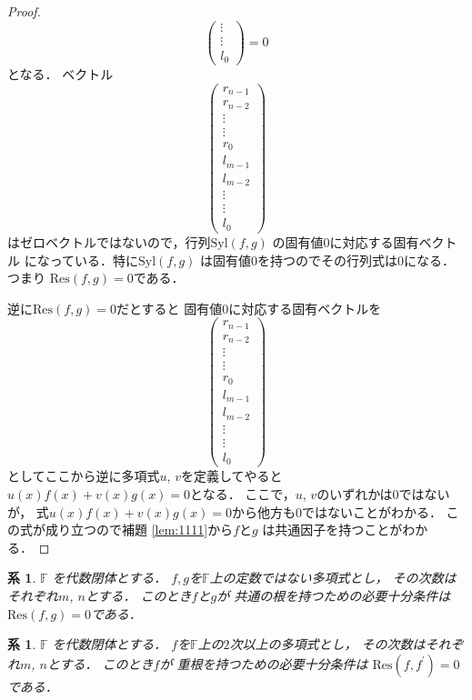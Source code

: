 \documentclass[leqno, a4paper, 12pt]{jsarticle}
\newtheorem{cor}[thm]{系}
\newcommand{\myfi}{\mathbb{F}}
\newcommand{\mysyl}{\mathrm{Syl}}
\newcommand{\myres}{\mathrm{Res}}
\begin{document}
\begin{proof}
\[\begin{pmatrix}
\vdots\\
\vdots\\
l_{0}
\end{pmatrix}
=0
\]
となる．
ベクトル
\[
\begin{pmatrix}
r_{n-1}\\
r_{n-2}\\
\vdots\\
\vdots\\
r_{0}\\
l_{m-1}\\
l_{m-2}\\
\vdots\\
\vdots\\
l_{0}
\end{pmatrix}
\]
はゼロベクトルではないので，行列$\mysyl(f, g)$
の固有値$0$に対応する固有ベクトル
になっている．特に$\mysyl(f, g)$
は固有値$0$を持つのでその行列式は$0$になる．
つまり
$\myres(f, g)=0$である．

逆に$\myres(f, g)=0$だとすると
固有値$0$に対応する固有ベクトルを
\[
\begin{pmatrix}
r_{n-1}\\
r_{n-2}\\
\vdots\\
\vdots\\
r_{0}\\
l_{m-1}\\
l_{m-2}\\
\vdots\\
\vdots\\
l_{0}
\end{pmatrix}
\]
としてここから逆に多項式$u$, $v$を定義してやると
$u(x)f(x)+v(x)g(x)=0$となる．
ここで，$u$, $v$のいずれかは$0$ではないが，
式$u(x)f(x)+v(x)g(x)=0$から他方も$0$ではないことがわかる．
この式が成り立つので補題
\ref{lem:1111}から$f$と$g$
は共通因子を持つことがわかる．
\end{proof}


\begin{cor}\label{cor:5555}
$\myfi$
を代数閉体とする．
$f, g$を$\myfi$上の定数ではない多項式とし，
その次数はそれぞれ$m$, $n$とする．
このとき$f$と$g$が
共通の根を持つための必要十分条件は
$\myres(f, g)=0$である．
\end{cor}


\begin{cor}\label{cor:6666}
$\myfi$
を代数閉体とする．
$f$を$\myfi$上の$2$次以上の多項式とし，
その次数はそれぞれ$m$, $n$とする．
このとき$f$が
重根を持つための必要十分条件は
$\myres(f, f^{\prime})=0$である．
\end{cor}
\end{document}
